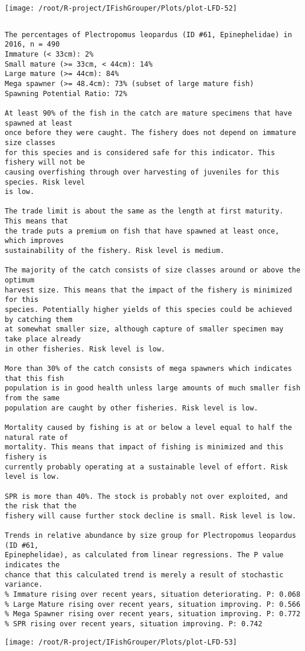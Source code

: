 \documentclass{report}\usepackage[]{graphicx}\usepackage[]{color}
\makeatletter
\def\maxwidth{ %
  \ifdim\Gin@nat@width>\linewidth
    \linewidth
  \else
    \Gin@nat@width
  \fi
}
\newenvironment{kframe}{%
 \def\at@end@of@kframe{}%
 \ifinner\ifhmode%
  \def\at@end@of@kframe{\end{minipage}}%
  \begin{minipage}{\columnwidth}%
 \fi\fi%
 \def\FrameCommand##1{\hskip\@totalleftmargin \hskip-\fboxsep
 \colorbox{shadecolor}{##1}\hskip-\fboxsep
     \hskip-\linewidth \hskip-\@totalleftmargin \hskip\columnwidth}%
 \MakeFramed {\advance\hsize-\width
   \@totalleftmargin\z@ \linewidth\hsize
   \@setminipage}}%
 {\par\unskip\endMakeFramed%
 \at@end@of@kframe}
\newenvironment{knitrout}{}{} %
\makeatother
\begin{document}
\begin{knitrout}
\texttt{[image: /root/R-project/IFishGrouper/Plots/plot-LFD-52]} 
\begin{kframe}\begin{verbatim}
\end{verbatim}
\end{kframe}
\clearpage
\newpage
\begin{kframe}\begin{verbatim}The percentages of Plectropomus leopardus (ID #61, Epinephelidae) in 2016, n = 490
Immature (< 33cm): 2%
Small mature (>= 33cm, < 44cm): 14%
Large mature (>= 44cm): 84%
Mega spawner (>= 48.4cm): 73% (subset of large mature fish)
Spawning Potential Ratio: 72%
 
At least 90% of the fish in the catch are mature specimens that have spawned at least
once before they were caught. The fishery does not depend on immature size classes
for this species and is considered safe for this indicator. This fishery will not be
causing overfishing through over harvesting of juveniles for this species. Risk level
is low.

The trade limit is about the same as the length at first maturity.  This means that
the trade puts a premium on fish that have spawned at least once, which improves
sustainability of the fishery. Risk level is medium.

The majority of the catch consists of size classes around or above the optimum
harvest size. This means that the impact of the fishery is minimized for this
species. Potentially higher yields of this species could be achieved by catching them
at somewhat smaller size, although capture of smaller specimen may take place already
in other fisheries. Risk level is low.

More than 30% of the catch consists of mega spawners which indicates that this fish
population is in good health unless large amounts of much smaller fish from the same
population are caught by other fisheries. Risk level is low.
 
Mortality caused by fishing is at or below a level equal to half the natural rate of
mortality. This means that impact of fishing is minimized and this fishery is
currently probably operating at a sustainable level of effort. Risk level is low.
 
SPR is more than 40%. The stock is probably not over exploited, and the risk that the
fishery will cause further stock decline is small. Risk level is low.
 
Trends in relative abundance by size group for Plectropomus leopardus (ID #61,
Epinephelidae), as calculated from linear regressions. The P value indicates the
chance that this calculated trend is merely a result of stochastic variance.
% Immature rising over recent years, situation deteriorating. P: 0.068
% Large Mature rising over recent years, situation improving. P: 0.566
% Mega Spawner rising over recent years, situation improving. P: 0.772
% SPR rising over recent years, situation improving. P: 0.742
\end{verbatim}
\end{kframe}
\texttt{[image: /root/R-project/IFishGrouper/Plots/plot-LFD-53]} 


\end{knitrout}
\end{document}
